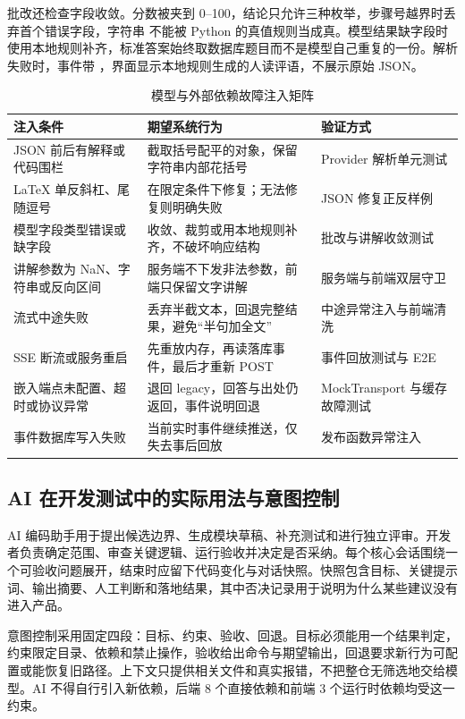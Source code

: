 批改还检查字段收敛。分数被夹到 0--100，结论只允许三种枚举，步骤号越界时丢弃首个错误字段，字符串  不能被 Python 的真值规则当成真。模型结果缺字段时使用本地规则补齐，标准答案始终取数据库题目而不是模型自己重复的一份。解析失败时，事件带 ，界面显示本地规则生成的人读评语，不展示原始 JSON。

\begin{table}[H]
\centering\footnotesize
\caption{模型与外部依赖故障注入矩阵}
\begin{tabularx}{\textwidth}{@{}L{3.2cm}Y L{3.4cm}@{}}
\toprule
\textbf{注入条件} & \textbf{期望系统行为} & \textbf{验证方式} \\
\midrule
JSON 前后有解释或代码围栏 & 截取括号配平的对象，保留字符串内部花括号 & Provider 解析单元测试 \\
LaTeX 单反斜杠、尾随逗号 & 在限定条件下修复；无法修复则明确失败 & JSON 修复正反样例 \\
模型字段类型错误或缺字段 & 收敛、裁剪或用本地规则补齐，不破坏响应结构 & 批改与讲解收敛测试 \\
讲解参数为 NaN、字符串或反向区间 & 服务端不下发非法参数，前端只保留文字讲解 & 服务端与前端双层守卫 \\
流式中途失败 & 丢弃半截文本，回退完整结果，避免“半句加全文” & 中途异常注入与前端清洗 \\
SSE 断流或服务重启 & 先重放内存，再读落库事件，最后才重新 POST & 事件回放测试与 E2E \\
嵌入端点未配置、超时或协议异常 & 退回 legacy，回答与出处仍返回，事件说明回退 & MockTransport 与缓存故障测试 \\
事件数据库写入失败 & 当前实时事件继续推送，仅失去事后回放 & 发布函数异常注入 \\
\bottomrule
\end{tabularx}
\end{table}

\subsection{AI 在开发测试中的实际用法与意图控制}

AI 编码助手用于提出候选边界、生成模块草稿、补充测试和进行独立评审。开发者负责确定范围、审查关键逻辑、运行验收并决定是否采纳。每个核心会话围绕一个可验收问题展开，结束时应留下代码变化与对话快照。快照包含目标、关键提示词、输出摘要、人工判断和落地结果，其中否决记录用于说明为什么某些建议没有进入产品。

意图控制采用固定四段：目标、约束、验收、回退。目标必须能用一个结果判定，约束限定目录、依赖和禁止操作，验收给出命令与期望输出，回退要求新行为可配置或能恢复旧路径。上下文只提供相关文件和真实报错，不把整仓无筛选地交给模型。AI 不得自行引入新依赖，后端 8 个直接依赖和前端 3 个运行时依赖均受这一约束。

